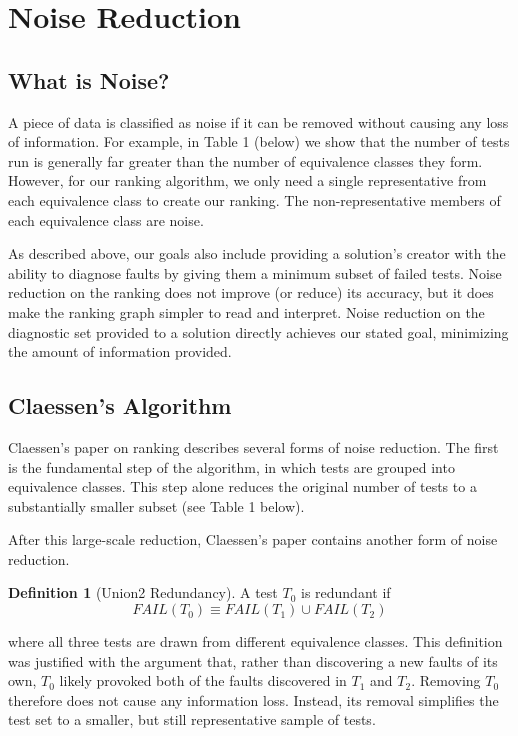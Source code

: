 \documentclass[11pt,twoside]{article}
\newcommand\fail{\mathit{FAIL}}
\theoremstyle{definition}
\newtheorem{defn}{Definition}
\begin{document}
\section{Noise Reduction}

\subsection{What is Noise?}
A piece of data is classified as noise if it can be removed without causing any loss of information. For example, in Table 1 (below) we show that the number of tests run is generally far greater than the number of equivalence classes they form. However, for our ranking algorithm, we only need a single representative from each equivalence class to create our ranking. The non-representative members of each equivalence class are noise. 

As described above, our goals also include providing a solution's creator with the ability to diagnose faults by giving them a minimum subset of failed tests. Noise reduction on the ranking does not improve (or reduce) its accuracy, but it does make the ranking graph simpler to read and interpret. Noise reduction on the diagnostic set provided to a solution directly achieves our stated goal, minimizing the amount of information provided.


\subsection{Claessen's Algorithm}
Claessen's paper on ranking describes several forms of noise reduction. The first is the fundamental step of the algorithm, in which tests are grouped into equivalence classes. This step alone reduces the original number of tests to a substantially smaller subset (see Table 1 below).

After this large-scale reduction, Claessen's paper contains another form of noise reduction. 

\begin{defn}[Union2 Redundancy]
A test $T_0$ is redundant if
$$\fail (T_0) \equiv \fail(T_1) \cup \fail(T_2)$$
\end{defn}
where all three tests are drawn from different equivalence classes. This definition was justified with the argument that, rather than discovering a new faults of its own, $T_0$ likely provoked both of the faults discovered in $T_1$ and $T_2$. Removing $T_0$ therefore does not cause any information loss. Instead, its removal simplifies the test set to a smaller, but still representative sample of tests.
\end{document}
